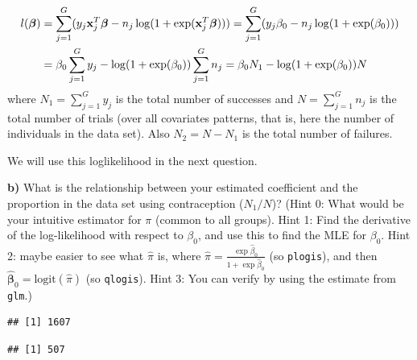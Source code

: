 \documentclass[
]{article}
\newenvironment{Shaded}{\begin{snugshade}}{\end{snugshade}}
\newcommand{\FunctionTok}[1]{\textcolor[rgb]{0.13,0.29,0.53}{\textbf{#1}}}
\newcommand{\NormalTok}[1]{#1}
\newcommand{\OtherTok}[1]{\textcolor[rgb]{0.56,0.35,0.01}{#1}}
\newcommand{\SpecialCharTok}[1]{\textcolor[rgb]{0.81,0.36,0.00}{\textbf{#1}}}
\begin{document}
\begin{align} l(\boldsymbol{\beta}) &=\sum_{j=1}^G (y_j{\bf x}_j^T \boldsymbol{\beta} - n_j \log(1+\exp({\bf x}_j^T\boldsymbol{\beta})))= \sum_{j=1}^G (y_j\beta_0 - n_j \log(1+\exp(\beta_0)))\\
&= \beta_0 \sum_{j=1}^G y_j - \log(1+\exp(\beta_0))\sum_{j=1}^G n_j =\beta_0 N_1 - \log(1+\exp(\beta_0))N
\end{align} where \(N_1=\sum_{j=1}^G y_j\) is the total number of
successes and \(N=\sum_{j=1}^G n_j\) is the total number of trials (over
all covariates patterns, that is, here the number of individuals in the
data set). Also \(N_2=N-N_1\) is the total number of failures.

We will use this loglikelihood in the next question.

\textbf{b)} What is the relationship between your estimated coefficient
and the proportion in the data set using contraception (\(N_1/N\))?
(Hint 0: What would be your intuitive estimator for \(\pi\) (common to
all groups). Hint 1: Find the derivative of the log-likelihood with
respect to \(\beta_0\), and use this to find the MLE for \(\beta_0\).
Hint 2: maybe easier to see what \(\hat{\pi}\) is, where
\(\hat{\pi}=\frac{\exp{\hat{\beta}_0}}{1+\exp{\hat{\beta}_0}}\) (so
\texttt{plogis}), and then
\(\hat{\boldsymbol{\beta}}_0=\text{logit}(\hat{\pi})\) (so
\texttt{qlogis}). Hint 3: You can verify by using the estimate from
\texttt{glm}.)

\begin{Shaded}
\end{Shaded}

\begin{verbatim}
## [1] 1607
\end{verbatim}

\begin{Shaded}
\end{Shaded}

\begin{verbatim}
## [1] 507
\end{verbatim}
\end{document}

